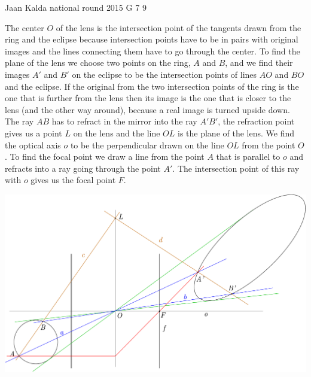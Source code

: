 \documentclass[11pt]{article}
\begin{document}
{Jaan Kalda} %
{national round} %
{2015} %
{G 7} %
{9} %
{

\ifEngSolution
The center $O$ of the lens is the intersection point of the tangents drawn from the ring and the eclipse because intersection points have to be in pairs with original images and the lines connecting them have to go through the center. To find the plane of the lens we choose two points on the ring, $A$ and $B$, and we find their images $A'$ and $B'$ on the eclipse to be the intersection points of lines $AO$ and $BO$ and the eclipse. If the original from the two intersection points of the ring is the one that is further from the lens then its image is the one that is closer to the lens (and the other way around), because a real image is turned upside down. The ray $AB$ has to refract in the mirror into the ray $A'B'$, the refraction point gives us a point $L$ on the lens and the line $OL$ is the plane of the lens. We find the optical axis $o$ to be the perpendicular drawn on the line $OL$ from the point $O$. To find the focal point we draw a line from the point $A$ that is parallel to $o$ and refracts into a ray going through the point $A'$. The intersection point of this ray with $o$ gives us the focal point $F$.
\begin{center}
\includegraphics[width=\textwidth]{2015-v3g-07-ellips_lah}
\end{center}
\fi
}
\end{document}
